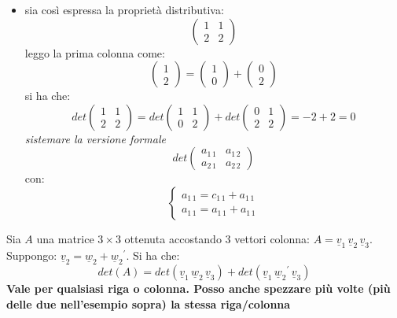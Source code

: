 \documentclass[a4paper,12pt, oneside]{book}
\begin{document}
\begin{itemize}
	\item sia così espressa la proprietà distributiva:
	      $$
		      \left(
		      \begin{matrix}
				      1 & 1 \\
				      2 & 2
			      \end{matrix}
		      \right)
	      $$
	      leggo la prima colonna come:
	      $$
		      \left(
		      \begin{matrix}
				      1 \\
				      2
			      \end{matrix}
		      \right)=
		      \left(
		      \begin{matrix}
				      1 \\
				      0
			      \end{matrix}
		      \right)+
		      \left(
		      \begin{matrix}
				      0 \\
				      2
			      \end{matrix}
		      \right)
	      $$
	      si ha che:
	      $$
		      det\left(
		      \begin{matrix}
				      1 & 1 \\
				      2 & 2
			      \end{matrix}
		      \right)=
		      det\left(
		      \begin{matrix}
				      1 & 1 \\
				      0 & 2
			      \end{matrix}
		      \right)+
		      det\left(
		      \begin{matrix}
				      0 & 1 \\
				      2 & 2
			      \end{matrix}
		      \right)=-2+2=0
	      $$
	      \textit{sistemare la versione formale}
	      $$
		      det\left(
		      \begin{matrix}
				      a_{1\,1} & a_{1\,2} \\
				      a_{2\,1} & a_{2\,2}
			      \end{matrix}
		      \right)$$
	      con:
	      $$\begin{cases}
			      a_{1\,1}=c_{1\,1}+a_{1\,1} \\
			      a_{1\,1}=a_{1\,1}+a_{1\,1}
		      \end{cases}$$
\end{itemize}
\begin{teorema}
	Sia $A$ una matrice $3\times 3$ ottenuta accostando 3 vettori colonna: $A=\underline{v}_1\, \underline{v}_2\, \underline{v}_3$. Suppongo:
	$\underline{v}_2=\underline{w}_2+{\underline{w}_2}^{'}$. Si ha che:
	$$det(A)=det(\underline{v}_1\, \underline{w}_2\, \underline{v}_3)+det(\underline{v}_1\, {\underline{w}_2}^{'}\, \underline{v}_3)$$
	\textbf{Vale per qualsiasi riga o colonna. Posso anche spezzare più volte (più delle due nell'esempio sopra) la stessa riga/colonna}
\end{teorema}
\end{document}
